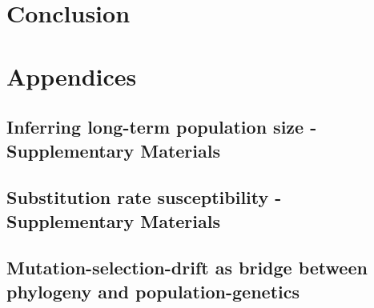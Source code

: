 \documentclass[a4paper,oneside,nobind]{thesis}
\begin{document}
\part{Conclusion}
\label{part:conclusion}


\part{Appendices}

\thispagestyle{empty}
\chapter{Inferring long-term population size - Supplementary Materials}
{\hypersetup{linkcolor=GREYDARK}\minitoc}
\label{chap:MutSelDrift-SuppMat}


\thispagestyle{empty}
\chapter{Substitution rate susceptibility - Supplementary Materials}
{\hypersetup{linkcolor=GREYDARK}\minitoc}
\label{chap:GenoPhenoFit-SuppMat}


\chapter*{Mutation-selection-drift as bridge between phylogeny and population-genetics}
\label{sec-appendix:PRF}


\thispagestyle{empty}
\label{sec-appendix:MutSelM3starMBE}


\thispagestyle{empty}


\end{document}
